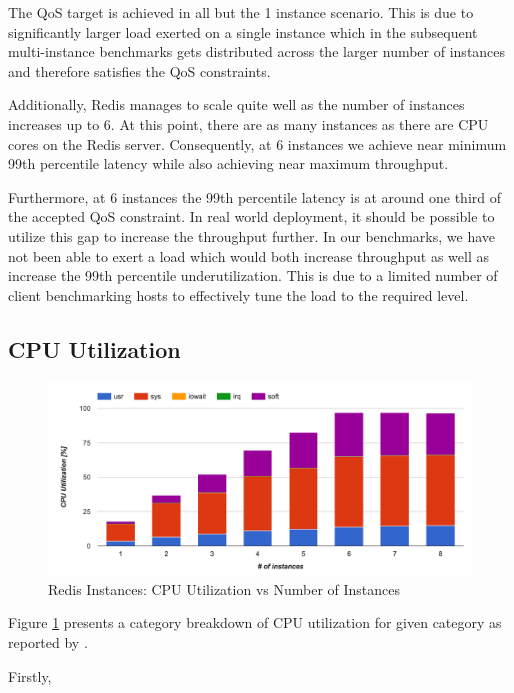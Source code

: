 The QoS target is achieved in all but the 1 instance scenario. This is due to significantly larger load exerted on a single instance which in the subsequent multi-instance benchmarks gets distributed across the larger number of instances and therefore satisfies the QoS constraints.

Additionally, Redis manages to scale quite well as the number of instances increases up to 6. At this point, there are as many instances as there are CPU cores on the Redis server. Consequently, at 6 instances we achieve near minimum 99th percentile latency while also achieving near maximum throughput.

Furthermore, at 6 instances the 99th percentile latency is at around one third of the accepted QoS constraint. In real world deployment, it should be possible to utilize this gap to increase the throughput further. In our benchmarks, we have not been able to exert a load which would both increase throughput as well as increase the 99th percentile underutilization. This is due to a limited number of client benchmarking hosts to effectively tune the load to the required level.


\subsection{CPU Utilization}

\begin{figure}[h]
    \includegraphics[width=\textwidth]{./res2/r_instances_cpu.png}
    \caption{Redis Instances: CPU Utilization vs Number of Instances}
    \label{fig:r_instances_cpu.png}
\end{figure}

Figure \ref{fig:r_instances_cpu.png} presents a category breakdown of CPU utilization for given category as reported by \textit{}.

Firstly,



